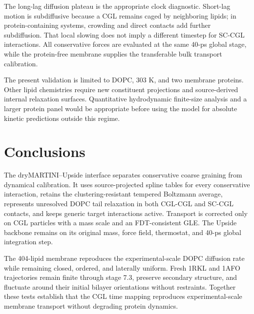 \documentclass{article}
\begin{document}
The long-lag diffusion plateau is the appropriate clock diagnostic.  Short-lag
motion is subdiffusive because a CGL remains caged by neighboring lipids; in
protein-containing systems, crowding and direct contacts add further
subdiffusion.  That local slowing does not imply a different timestep for
SC-CGL interactions.  All conservative forces are evaluated at the same
40-ps global stage, while the protein-free membrane supplies the transferable
bulk transport calibration.

The present validation is limited to DOPC, 303 K, and two membrane proteins.
Other lipid chemistries require new constituent projections and source-derived
internal relaxation surfaces.  Quantitative hydrodynamic finite-size analysis
and a larger protein panel would be appropriate before using the model for
absolute kinetic predictions outside this regime.

\section{Conclusions}

The dryMARTINI--Upside interface separates conservative coarse graining from
dynamical calibration.  It uses source-projected spline tables for every
conservative interaction, retains the clustering-resistant tempered Boltzmann
average, represents unresolved DOPC tail relaxation in both CGL-CGL and SC-CGL
contacts, and keeps generic target interactions active.
Transport is corrected only on CGL particles with a mass scale and an
FDT-consistent GLE.  The Upside backbone remains on its original mass, force
field, thermostat, and 40-ps global integration step.

The 404-lipid membrane reproduces the experimental-scale DOPC diffusion rate
while remaining closed, ordered, and laterally uniform.  Fresh 1RKL and 1AFO
trajectories remain finite through stage 7.3, preserve secondary structure,
and fluctuate around their initial bilayer orientations without restraints.
Together these tests establish that the CGL time mapping reproduces
experimental-scale membrane transport without degrading protein dynamics.
\end{document}
